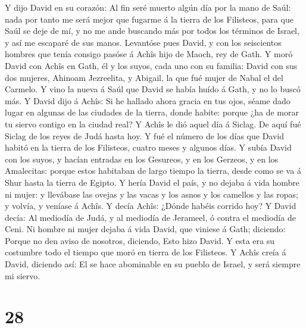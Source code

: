  Y dijo David en su corazón: Al fin seré muerto algún día
por la mano de Saúl: nada por tanto me será mejor que fugarme á la
tierra de los Filisteos, para que Saúl se deje de mí, y no me ande
buscando más por todos los términos de Israel, y así me escaparé de sus
manos.  Levantóse pues David, y con los seiscientos hombres
que tenía consigo pasóse á Achîs hijo de Maoch, rey de Gath.
 Y moró David con Achîs en Gath, él y los suyos, cada uno
con su familia: David con sus dos mujeres, Ahinoam Jezreelita, y
Abigail, la que fué mujer de Nabal el del Carmelo.  Y vino
la nueva á Saúl que David se había huído á Gath, y no lo buscó más.
 Y David dijo á Achîs: Si he hallado ahora gracia en tus
ojos, séame dado lugar en algunas de las ciudades de la tierra, donde
habite: porque ¿ha de morar tu siervo contigo en la ciudad real?
 Y Achîs le dió aquel día á Siclag. De aquí fué Siclag de
los reyes de Judá hasta hoy.  Y fué el número de los días
que David habitó en la tierra de los Filisteos, cuatro meses y algunos
días.  Y subía David con los suyos, y hacían entradas en los
Gesureos, y en los Gerzeos, y en los Amalecitas: porque estos habitaban
de largo tiempo la tierra, desde como se va á Shur hasta la tierra de
Egipto.  Y hería David el país, y no dejaba á vida hombre ni
mujer: y llevábase las ovejas y las vacas y los asnos y los camellos y
las ropas; y volvía, y veníase á Achîs.  Y decía Achîs:
¿Dónde habéis corrido hoy? Y David decía: Al mediodía de Judá, y al
mediodía de Jerameel, ó contra el mediodía de Ceni.  Ni
hombre ni mujer dejaba á vida David, que viniese á Gath; diciendo:
Porque no den aviso de nosotros, diciendo, Esto hizo David. Y esta era
su costumbre todo el tiempo que moró en tierra de los Filisteos.
 Y Achîs creía á David, diciendo así: El se hace abominable
en su pueblo de Israel, y será siempre mi siervo.

\hypertarget{section-27}{%
\section{28}\label{section-27}}

